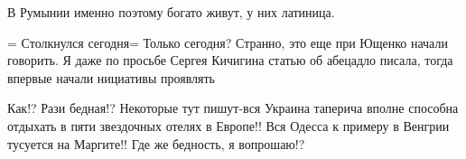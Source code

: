 \begin{itemize}
В Румынии именно поэтому богато живут, у них латиница.

 

= Столкнулся сегодня= Только сегодня? Странно, это еще при Ющенко начали
говорить. Я даже по просьбе Сергея Кичигина статью об абецадло писала, тогда
впервые начали нициативы проявлять

 

Как!? Рази бедная!? Некоторые тут пишут-вся Украина таперича вполне способна
отдыхать в пяти звездочных отелях в Европе!! Вся Одесса к примеру в Венгрии
тусуется на Маргите!! Где же бедность, я вопрошаю!?
\end{itemize}

